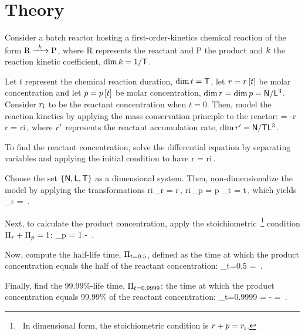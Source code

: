 \section{Theory}
%
Consider a batch reactor hosting a first-order-kinetics chemical reaction of the form $\ce{R ->[\kchrcoeff] P}$, where \ce R represents the reactant and \ce P the product and $k$ the reaction kinetic coefficient, $\dim k = 1/\mathsf{T}$.

Let $t$ represent the chemical reaction duration, $\dim t = \mathsf{T}$, let $r = r\left[{t}\right]$ be  molar concentration and let $p = p\left[{t}\right]$ be  molar concentration, $\dim r = \dim p = \mathsf{N}/\mathsf{L}^3$. Consider $r_\text{i}$ to be the reactant concentration when $t = 0$. Then, model the reaction kinetics by applying the mass conservation principle to the reactor:
\beq
{} = -\kchrcoeff\sconc r\qquad{}\qquad
\sconc r = \sconc r\txt i\,,
\eeq
where ${r}^{\prime}$ represents the reactant accumulation rate, $\dim{r}^{\prime} = \mathsf{N}/\mathsf{T}\mathsf{L}^3$.

To find the reactant concentration, solve the differential equation by separating variables and applying the initial condition to have
\beq
\sconc r = \sconc r\txt i\exp{}\,.
\eeq
 
Choose the set $\left\lbrace{\mathsf{N}, \mathsf{L},\mathsf{T}}\right\rbrace$ as a dimensional system. Then, non-dimensionalize the model by applying the transformations
\beq
\sconc r\txt i\,\kdim_{\sconc r} = \sconc r\,,\qquad
\sconc r\txt i\,\kdim_{\sconc p} = \sconc p\qquad{}\qquad
\kdim_t = \kchrcoeff t\,,
\eeq
which yields
\beq
\kdim_{\sconc r} = \exp{}\,.
\eeq

Next, to calculate the product concentration, apply the stoichiometric~\footnote{~In dimensional form, the stoichiometric condition is $r + p = r_\text{i}$.} condition $\Pi_{r} + \Pi_{p} = 1$:
\beq
\kdim_{\sconc p} = 1 - \exp{}\,.
\eeq

Now, compute the half-life time, $\Pi_{t=0.5}$, defined as the time at which the product concentration equals the half of the reactant concentration:
\beq
\kdim_{t=0.5} = \ln{}\,.
\eeq

Finally, find the 99.99\%-life time, $\Pi_{t=0.9999}$: the time at which the product concentration equals 99.99\% of the reactant concentration:
\beq
\kdim_{t=0.9999} = -\ln{} = \ln{}\,.\mqed
\eeq

